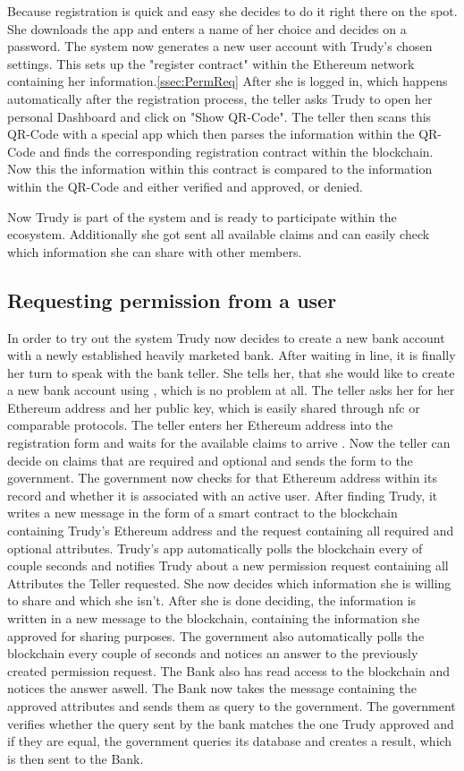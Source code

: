 Because registration is quick and easy she decides to do it right there on the spot. She downloads the app and enters a name of her choice and decides on a password. The system now generates a new user account with Trudy's chosen settings. This sets up the "register contract" within the Ethereum network containing her information.\ref{ssec:PermReq} After she is logged in, which happens automatically after the registration process, the teller asks Trudy to open her personal Dashboard and click on "Show QR-Code". The teller then scans this QR-Code with a special app which then parses the information within the QR-Code and finds the corresponding registration contract within the blockchain. Now this the information within this contract is compared to the information within the QR-Code and either verified and approved, or denied.

Now Trudy is part of the system and is ready to participate within the \projectName{} ecosystem. Additionally she got sent all available claims and can easily check which information she can share with other members.

\subsection{Requesting permission from a user}
\label{ssec:requestingPermission}
In order to try out the system Trudy now decides to create a new bank account with a newly established heavily marketed bank. After waiting in line, it is finally her turn to speak with the bank teller. She tells her, that she would like to create a new bank account using \projectName{}, which is no problem at all. The teller asks her for her Ethereum address and her public key, which is easily shared through nfc or comparable protocols.
The teller enters her Ethereum address into the registration form and waits for the available claims to arrive . Now the teller can decide on claims that are required and optional and sends the form to the government.
The government now checks for that Ethereum address within its record and whether it is associated with an active user. After finding Trudy, it writes a new message in the form of a smart contract to the blockchain containing Trudy's Ethereum address and the request containing all required and optional attributes.
Trudy's app automatically polls the blockchain every of couple seconds and notifies Trudy about a new permission request containing all Attributes the Teller requested. She now decides which information she is willing to share and which she isn't. After she is done deciding, the information is written in a new message to the blockchain, containing the information she approved for sharing purposes.
The government also automatically polls the blockchain every couple of seconds and notices an answer to the previously created permission request.
The Bank also has read access to the blockchain and notices the answer aswell. The Bank now takes the message containing the approved attributes and sends them as query to the government.
The government verifies whether the query sent by the bank matches the one Trudy approved and if they are equal, the government queries its database and creates a result, which is then sent to the Bank.

